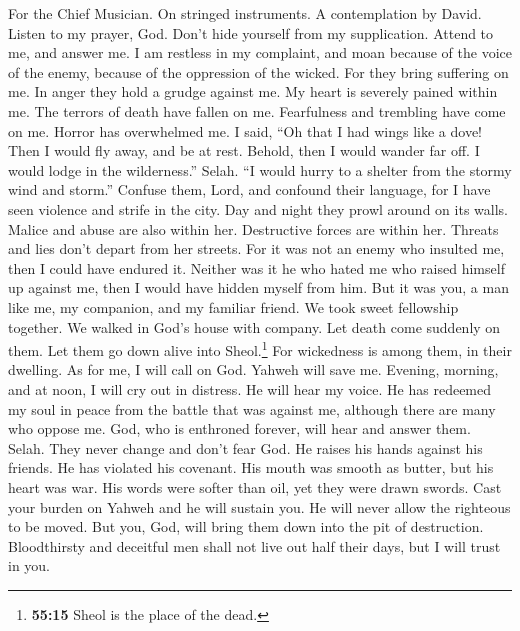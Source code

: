 For the Chief Musician. On stringed instruments. A contemplation by
David.  Listen to my prayer, God. Don't hide yourself from
my supplication.  Attend to me, and answer me. I am
restless in my complaint, and moan  because of the voice
of the enemy, because of the oppression of the wicked. For they bring
suffering on me. In anger they hold a grudge against me. 
My heart is severely pained within me. The terrors of death have fallen
on me.  Fearfulness and trembling have come on me. Horror
has overwhelmed me.  I said, ``Oh that I had wings like a
dove! Then I would fly away, and be at rest.  Behold, then
I would wander far off. I would lodge in the wilderness.'' Selah.
 ``I would hurry to a shelter from the stormy wind and
storm.''  Confuse them, Lord, and confound their language,
for I have seen violence and strife in the city.  Day and
night they prowl around on its walls. Malice and abuse are also within
her.  Destructive forces are within her. Threats and lies
don't depart from her streets.  For it was not an enemy
who insulted me, then I could have endured it. Neither was it he who
hated me who raised himself up against me, then I would have hidden
myself from him.  But it was you, a man like me, my
companion, and my familiar friend.  We took sweet
fellowship together. We walked in God's house with company.
 Let death come suddenly on them. Let them go down alive
into Sheol.\footnote{\textbf{55:15} Sheol is the place of the dead.} For
wickedness is among them, in their dwelling.  As for me,
I will call on God. Yahweh will save me.  Evening,
morning, and at noon, I will cry out in distress. He will hear my voice.
 He has redeemed my soul in peace from the battle that
was against me, although there are many who oppose me. 
God, who is enthroned forever, will hear and answer them. Selah. They
never change and don't fear God.  He raises his hands
against his friends. He has violated his covenant.  His
mouth was smooth as butter, but his heart was war. His words were softer
than oil, yet they were drawn swords.  Cast your burden
on Yahweh and he will sustain you. He will never allow the righteous to
be moved.  But you, God, will bring them down into the
pit of destruction. Bloodthirsty and deceitful men shall not live out
half their days, but I will trust in you.

